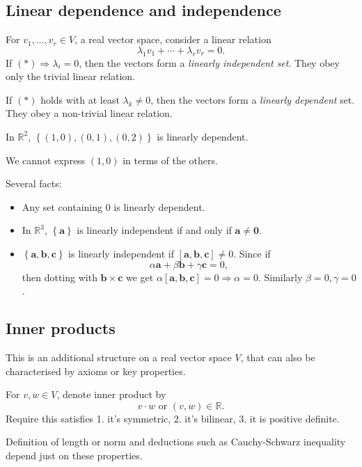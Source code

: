 \documentclass[10pt]{article}
\newcommand{\bluecomment}[1]{{\color{blue}#1}}
\begin{document}
    \subsection{Linear dependence and independence}
    For $ v_1,\dots,v_r\in V $, a real vector space, consider a linear relation
    \[
        \lambda_1 v_1+\cdots+\lambda_r v_r=0\tag{*}
    .\]
    If $ (*)\Rightarrow \lambda_i=0 $, then the vectors form a \textit{linearly independent set}. They obey only the trivial linear relation.

    If $ (*) $ holds with at least $ \lambda_k\neq 0 $, then the vectors form a \textit{linearly dependent} set. They obey a non-trivial linear relation.
    \begin{example}
        In $ \mathbb{R}^2 $, $ \left\{ (1,0),(0,1),(0,2)\right\} $ is linearly dependent.

        \bluecomment{We cannot express $(1,0)$ in terms of the others.}
    \end{example}
    Several facts:
    \begin{itemize}
        \item Any set containing $0$ is linearly dependent.
        \item In $ \mathbb{R}^3 $, $ \left\{ \mathbf{a}\right\} $ is linearly independent if and only if $ \mathbf{a}\neq \mathbf{0} $.
        \item $ \left\{ \mathbf{a},\mathbf{b},\mathbf{c}\right\} $ is linearly independent if $ [\mathbf{a},\mathbf{b},\mathbf{c}]\neq 0 $. Since if 
        \[
            \alpha \mathbf{a}+\beta \mathbf{b}+\gamma \mathbf{c}=0
        ,\]
        then dotting with $ \mathbf{b}\times \mathbf{c} $ we get $ \alpha[\mathbf{a},\mathbf{b},\mathbf{c}]=0 \Rightarrow \alpha=0 $. Similarly $ \beta=0, \gamma=0 $.
    \end{itemize}
    \subsection{Inner products}
    This is an additional structure on a real vector space $V$, that can also be characterised by axioms or key properties.

    For $v,w\in V$, denote inner product by 
    \[
        v\cdot w \text{  or  } (v,w)\in \mathbb{R} 
    .\]
    Require this satisfies 1. it's symmetric, 2. it's bilinear, 3. it is positive definite.

    Definition of length or norm and deductions such as Cauchy-Schwarz inequality depend just on these properties.
\end{document}
